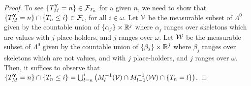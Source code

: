 \TMtYStoppingTime*
\begin{proof}
To see $\{{T_M^{\mathsf{Y}} = n}\} \in \mathcal{F}_{T_n}$ for a given $n$, we need to show that $\{{T_M^{\mathsf{Y}} = n}\} \cap \{{T_n \leq i}\} \in \mathcal{F}_i$, for all $i \in \omega$.
Let $\cal V$ be the measurable subset of $\Lambda^0$ given by the countable union of $\{{\alpha_j}\} \times \mathbb{R}^j$ where $\alpha_j$ ranges over skeletons which are values with $j$ place-holders, and $j$ ranges over $\omega$.
Let $\cal W$ be the measurable subset of $\Lambda^0$ given by the countable union of $\{{\beta_j}\} \times \mathbb{R}^j$ where $\beta_j$ ranges over skeletons which are not values, and with $j$ place-holders, and $j$ ranges over $\omega$.
Then, it suffices to observe that $\set{T_M^\tY = n} \cap \set{T_n \leq i}
= \bigcup_{l=n}^i 
\big( M_l^{-1} ({\cal V}) \cap  
M_{l-1}^{-1} ({\cal W}) \cap 
\set{T_n = l} \big)
$.
\end{proof}



